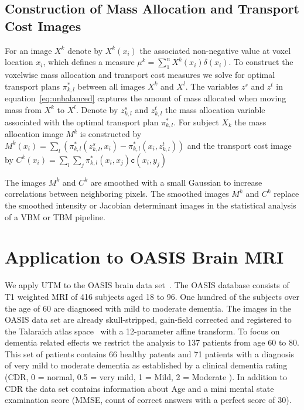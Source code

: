 \documentclass{llncs}
\newcommand{\cost}[0]{\mathtt{c}}
\newcommand{\coupling}[0]{\pi}
\begin{document}
\subsection{Construction of Mass Allocation and Transport Cost Images}
\label{sec:mass}
For an image $X^k$ denote by $X^k(x_i)$ the associated non-negative value at
voxel location $x_i$, which defines a measure $\mu^k = \sum_1^n X^k(x_i)
\delta(x_i)$.  To construct the voxelwise mass allocation and transport cost
measures we solve for optimal transport plans $\coupling^*_{k,l}$ between all
images $X^k$ and $X^l$.  The variables $z^s$ and $z^t$ in
equation~\ref{eq:unbalanced} captures the amount of mass allocated when moving
mass from $X^k$ to $X^l$. Denote by $z^s_{k, l}$ and $z^t_{k,l}$ the mass
allocation variable associated with the optimal transport plan
$\coupling^*_{k,l}$. For subject $X_k$ the mass allocation image $M^k$ is
constructed by 
$
M^k(x_i) = \sum_l \left( 
  \coupling^*_{k,l}( z^s_{k, l}, x_i) - 
  \coupling^*_{k,l}( x_i, z^t_{k, l} ) 
\right)
$ 
and the transport cost image by 
$C^k(x_i) = \sum_l \sum_j \coupling^*_{k,l}( x_i, x_j ) \cost(x_i, y_j)$

The images $M^k$ and $C^k$ are smoothed with a small Gaussian to increase
correlations between neighboring pixels. The smoothed images $M^k$ and $C^k$
replace the smoothed intensity or Jacobian determinant images in the
statistical analysis of a VBM or TBM pipeline. 


\section{Application to OASIS Brain MRI}
\label{sec:results}
We apply UTM to the OASIS brain data set~\cite{marcus2010open}. The OASIS
database consists of T1 weighted MRI of 416 subjects aged 18 to 96. One hundred
of the subjects over the age of 60 are diagnosed with mild to moderate
dementia. The images in the OASIS data set are already skull-stripped,
gain-field corrected and registered to the Talaraich atlas
space~\cite{talaraich:book88} with a 12-parameter affine transform.  To focus
on dementia related effects we restrict the analysis to 137 patients from age
60 to 80. This set of patients contains 66 healthy patents and 71 patients with
a diagnosis of very mild to moderate dementia as established by a clinical
dementia rating (CDR, 0 = normal, 0.5 = very mild, 1 = Mild, 2 = Moderate ). In
addition to CDR the data set contains information about Age and a mini mental
state examination score (MMSE, count of correct answers with a perfect score of
30).
\end{document}
